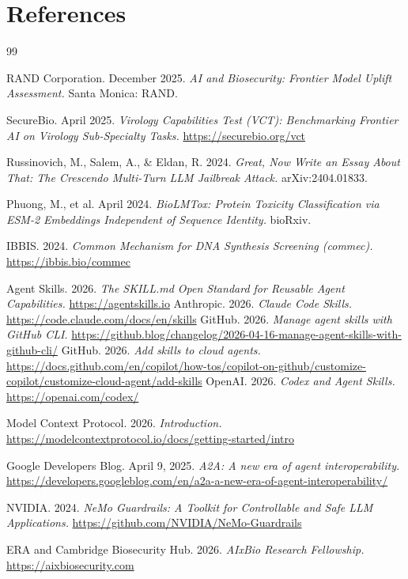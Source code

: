 \documentclass[10.5pt,a4paper]{article}
\begin{document}
\section*{References}

\begin{thebibliography}{99}

RAND Corporation. December 2025.
\textit{AI and Biosecurity: Frontier Model Uplift Assessment.}
Santa Monica: RAND.

SecureBio. April 2025.
\textit{Virology Capabilities Test (VCT): Benchmarking Frontier AI on Virology Sub-Specialty Tasks.}
\url{https://securebio.org/vct}

Russinovich, M., Salem, A., \& Eldan, R. 2024.
\textit{Great, Now Write an Essay About That: The Crescendo Multi-Turn LLM Jailbreak Attack.}
arXiv:2404.01833.

Phuong, M., et al. April 2024.
\textit{BioLMTox: Protein Toxicity Classification via ESM-2 Embeddings Independent of Sequence Identity.}
bioRxiv.

IBBIS. 2024.
\textit{Common Mechanism for DNA Synthesis Screening (commec).}
\url{https://ibbis.bio/commec}

Agent Skills. 2026.
\textit{The SKILL.md Open Standard for Reusable Agent Capabilities.}
\url{https://agentskills.io}
Anthropic. 2026.
\textit{Claude Code Skills.}
\url{https://code.claude.com/docs/en/skills}
GitHub. 2026.
\textit{Manage agent skills with GitHub CLI.}
\url{https://github.blog/changelog/2026-04-16-manage-agent-skills-with-github-cli/}
GitHub. 2026.
\textit{Add skills to cloud agents.}
\url{https://docs.github.com/en/copilot/how-tos/copilot-on-github/customize-copilot/customize-cloud-agent/add-skills}
OpenAI. 2026.
\textit{Codex and Agent Skills.}
\url{https://openai.com/codex/}

Model Context Protocol. 2026.
\textit{Introduction.}
\url{https://modelcontextprotocol.io/docs/getting-started/intro}

Google Developers Blog. April 9, 2025.
\textit{A2A: A new era of agent interoperability.}
\url{https://developers.googleblog.com/en/a2a-a-new-era-of-agent-interoperability/}

NVIDIA. 2024.
\textit{NeMo Guardrails: A Toolkit for Controllable and Safe LLM Applications.}
\url{https://github.com/NVIDIA/NeMo-Guardrails}

ERA and Cambridge Biosecurity Hub. 2026.
\textit{AIxBio Research Fellowship.}
\url{https://aixbiosecurity.com}

\end{thebibliography}
\end{document}
